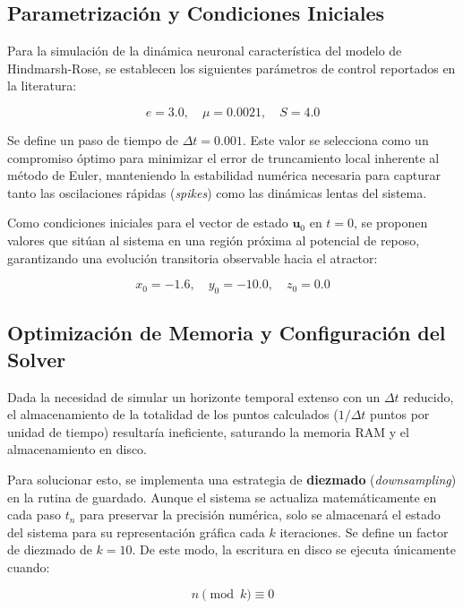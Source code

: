 \documentclass{article}
\begin{document}
\subsection{Parametrización y Condiciones Iniciales}

Para la simulación de la dinámica neuronal característica del modelo de Hindmarsh-Rose, se establecen los siguientes parámetros de control reportados en la literatura:

\begin{equation*}
    e = 3.0, \quad \mu = 0.0021, \quad S = 4.0
\end{equation*}

Se define un paso de tiempo de $\Delta t = 0.001$. Este valor se selecciona como un compromiso óptimo para minimizar el error de truncamiento local inherente al método de Euler, manteniendo la estabilidad numérica necesaria para capturar tanto las oscilaciones rápidas (\textit{spikes}) como las dinámicas lentas del sistema.

Como condiciones iniciales para el vector de estado $\mathbf{u}_0$ en $t=0$, se proponen valores que sitúan al sistema en una región próxima al potencial de reposo, garantizando una evolución transitoria observable hacia el atractor:

\begin{equation*}
    x_0 = -1.6, \quad y_0 = -10.0, \quad z_0 = 0.0
\end{equation*}

\subsection{Optimización de Memoria y Configuración del Solver}

Dada la necesidad de simular un horizonte temporal extenso con un $\Delta t$ reducido, el almacenamiento de la totalidad de los puntos calculados ($1/\Delta t$ puntos por unidad de tiempo) resultaría ineficiente, saturando la memoria RAM y el almacenamiento en disco.

Para solucionar esto, se implementa una estrategia de \textbf{diezmado} (\textit{downsampling}) en la rutina de guardado. Aunque el sistema se actualiza matemáticamente en cada paso $t_n$ para preservar la precisión numérica, solo se almacenará el estado del sistema para su representación gráfica cada $k$ iteraciones. Se define un factor de diezmado de $k = 10$. De este modo, la escritura en disco se ejecuta únicamente cuando:

\begin{equation}
    n \pmod{k} \equiv 0
\end{equation}
\end{document}
